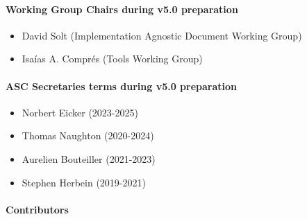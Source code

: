 \paragraph*{Working Group Chairs during v5.0 preparation}

\begin{itemize}
    \item David Solt (Implementation Agnostic Document Working Group)
    \item Isaías A. Comprés (Tools Working Group)
\end{itemize}

\paragraph*{ASC Secretaries terms during v5.0 preparation}

\begin{itemize}
    \item Norbert Eicker (2023-2025)
    \item Thomas Naughton (2020-2024)
    \item Aurelien Bouteiller (2021-2023)
    \item Stephen Herbein (2019-2021)
\end{itemize}

\paragraph*{Contributors}

